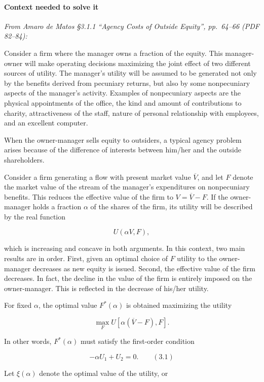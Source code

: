 \documentclass[11pt,a4paper]{article}
\begin{document}
\paragraph{Context needed to solve it}

\emph{From Amaro de Matos §3.1.1 ``Agency Costs of Outside Equity'', pp.~64--66 (PDF 82--84):}

Consider a firm where the manager owns a fraction of the equity. This manager-owner will make
operating decisions maximizing the joint effect of two different sources of utility. The manager's
utility will be assumed to be generated not only by the benefits derived from pecuniary returns, but
also by some nonpecuniary aspects of the manager's activity. Examples of nonpecuniary aspects are
the physical appointments of the office, the kind and amount of contributions to charity,
attractiveness of the staff, nature of personal relationship with employees, and an excellent
computer.

When the owner-manager sells equity to outsiders, a typical agency problem arises because of the
difference of interests between him/her and the outside shareholders.

Consider a firm generating a flow with present market value \(\overline{V}\), and let \(F\) denote
the market value of the stream of the manager's expenditures on nonpecuniary benefits. This reduces
the effective value of the firm to \(V = \overline{V} - F\). If the owner-manager holds a fraction
\(\alpha\) of the shares of the firm, its utility will be described by the real function

\[U(\alpha V, F),\]

which is increasing and concave in both arguments. In this context, two main results are in order.
First, given an optimal choice of \(F\) utility to the owner-manager decreases as new equity is
issued. Second, the effective value of the firm decreases. In fact, the decline in the value of the
firm is entirely imposed on the owner-manager. This is reflected in the decrease of his/her utility.

For fixed \(\alpha\), the optimal value \(F^*(\alpha)\) is obtained maximizing the utility

\[\max_F U[\alpha(\overline{V} - F), F].\]

In other words, \(F^*(\alpha)\) must satisfy the first-order condition

\[-\alpha U_1 + U_2 = 0. \qquad (3.1)\]

Let \(\xi(\alpha)\) denote the optimal value of the utility, or
\end{document}
